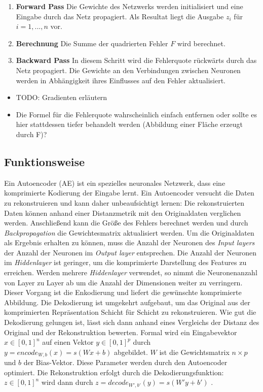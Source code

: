 \begin{enumerate}
	\item \textbf{Forward Pass} Die Gewichte des Netzwerks werden initialisiert und eine Eingabe durch das Netz propagiert. Als Resultat liegt die Ausgabe $z_{i}$ für $i=1,...,n$ vor.
	\item \textbf{Berechnung} Die Summe der quadrierten Fehler $F$ wird berechnet.
	\item \textbf{Backward Pass} In diesem Schritt wird die Fehlerquote rückwärts durch das Netz propagiert. Die Gewichte an den Verbindungen zwischen Neuronen werden in Abhängigkeit ihres Einflusses auf den Fehler aktualisiert.
\end{enumerate}

\begin{itemize}
	\item TODO: Gradienten erläutern
	\item Die Formel für die Fehlerquote wahrscheinlich einfach entfernen oder sollte es hier stattdessen tiefer behandelt werden (Abbildung einer Fläche erzeugt durch F)?
\end{itemize}

\subsection{Funktionsweise}
Ein Autoencoder (AE) ist ein spezielles neuronales Netzwerk, dass eine komprimierte Kodierung der Eingabe lernt. Ein Autoencoder versucht die Daten zu rekonstruieren und kann daher unbeaufsichtigt lernen: Die rekonstruierten Daten können anhand einer Distanzmetrik mit den Originaldaten verglichen werden. Anschließend kann die Größe des Fehlers berechnet werden und durch \textit{Backpropagation} die Gewichtesmatrix aktualisiert werden.
Um die Originaldaten als Ergebnis erhalten zu können, muss die Anzahl der Neuronen des \textit{Input layers} der Anzahl der Neuronen im \textit{Output layer} entsprechen. Die Anzahl der Neuronen im \textit{Hiddenlayer} ist geringer, um die komprimierte Darstellung des Features zu erreichen. Werden mehrere \textit{Hiddenlayer} verwendet, so nimmt die Neuronenanzahl von Layer zu Layer ab um die Anzahl der Dimensionen weiter zu verringern. Dieser Vorgang ist die Enkodierung und liefert die gewünschte komprimierte Abbildung. Die Dekodierung ist umgekehrt aufgebaut, um das Original aus der komprimierten Repräsentation Schicht für Schicht zu rekonstruieren. Wie gut die Dekodierung gelungen ist, lässt sich dann anhand eines Vergleichs der Distanz des Original und der Rekonstruktion bewerten. Formal wird ein Eingabevektor $x \in [0,1]^n$ auf einen Vektor $y \in [0,1]^p$ durch $y = encode_{W,b}(x) = s(Wx + b)$ abgebildet. $W$ ist die Gewichtsmatrix $n \times p$ und $b$ der Bias-Vektor. Diese Parameter werden durch den Autoencoder optimiert. Die Rekonstruktion erfolgt durch die Dekodierungsfunktion: $z \in [0, 1]^n$ wird dann durch $z = decode_{W', b'}(y) = s(W'y + b')$ \cite{ssn1997}.


